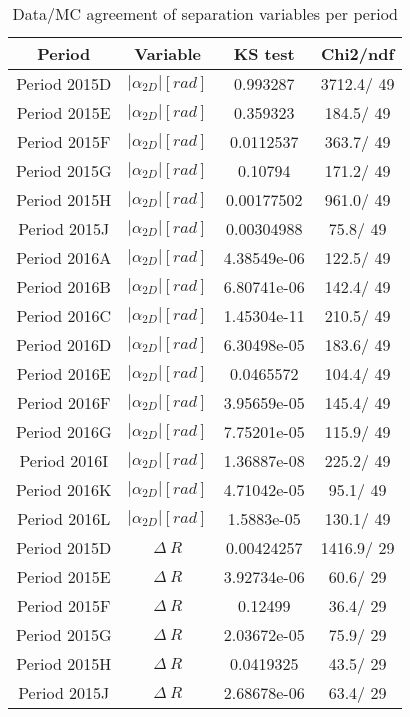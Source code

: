 \documentclass{article}
\begin{document}
\begin{longtable}{c|c|c|c}
\caption{\label{tab:sepVarsandSepPeriods}Data/MC agreement of separation variables per period}\\
Period & Variable & KS test & Chi2/ndf \\
\hline
 Period 2015D & $|\alpha_{2D}| [rad]$ & 0.993287 & 3712.4/ 49\\
\hline
 Period 2015E & $|\alpha_{2D}| [rad]$ & 0.359323 & 184.5/ 49\\
\hline
 Period 2015F & $|\alpha_{2D}| [rad]$ & 0.0112537 & 363.7/ 49\\
\hline
 Period 2015G & $|\alpha_{2D}| [rad]$ & 0.10794 & 171.2/ 49\\
\hline
 Period 2015H & $|\alpha_{2D}| [rad]$ & 0.00177502 & 961.0/ 49\\
\hline
 Period 2015J & $|\alpha_{2D}| [rad]$ & 0.00304988 &  75.8/ 49\\
\hline
 Period 2016A & $|\alpha_{2D}| [rad]$ & 4.38549e-06 & 122.5/ 49\\
\hline
 Period 2016B & $|\alpha_{2D}| [rad]$ & 6.80741e-06 & 142.4/ 49\\
\hline
 Period 2016C & $|\alpha_{2D}| [rad]$ & 1.45304e-11 & 210.5/ 49\\
\hline
 Period 2016D & $|\alpha_{2D}| [rad]$ & 6.30498e-05 & 183.6/ 49\\
\hline
 Period 2016E & $|\alpha_{2D}| [rad]$ & 0.0465572 & 104.4/ 49\\
\hline
 Period 2016F & $|\alpha_{2D}| [rad]$ & 3.95659e-05 & 145.4/ 49\\
\hline
 Period 2016G & $|\alpha_{2D}| [rad]$ & 7.75201e-05 & 115.9/ 49\\
\hline
 Period 2016I & $|\alpha_{2D}| [rad]$ & 1.36887e-08 & 225.2/ 49\\
\hline
 Period 2016K & $|\alpha_{2D}| [rad]$ & 4.71042e-05 &  95.1/ 49\\
\hline
 Period 2016L & $|\alpha_{2D}| [rad]$ & 1.5883e-05 & 130.1/ 49\\
\hline
 Period 2015D & $\Delta~R$ & 0.00424257 & 1416.9/ 29\\
\hline
 Period 2015E & $\Delta~R$ & 3.92734e-06 &  60.6/ 29\\
\hline
 Period 2015F & $\Delta~R$ & 0.12499 &  36.4/ 29\\
\hline
 Period 2015G & $\Delta~R$ & 2.03672e-05 &  75.9/ 29\\
\hline
 Period 2015H & $\Delta~R$ & 0.0419325 &  43.5/ 29\\
\hline
 Period 2015J & $\Delta~R$ & 2.68678e-06 &  63.4/ 29\\

\end{longtable}
\end{document}
